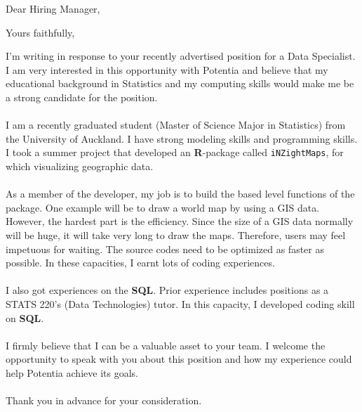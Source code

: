 \documentclass[12pt,a4paper,sans]{moderncv}        %
\begin{document}
	\date{\today}
	\opening{Dear Hiring Manager,}
	\closing{Yours faithfully,}
	\makelettertitle
		
	I’m writing in response to your recently advertised position for a Data Specialist. I am very interested in this opportunity with Potentia and believe that my educational background in Statistics and my computing skills would make me be a strong candidate for the position. \\~\\
	I am a recently graduated student (Master of Science Major in Statistics) from the University of Auckland. I have strong modeling skills and programming skills. I took a summer project that developed an \textbf{R}-package called \texttt{iNZightMaps}, for which visualizing geographic data. \\~\\
	As a member of the developer, my job is to build the based level functions of the package. One example will be to draw a world map by using a GIS data. 
	However, the hardest part is the efficiency. Since the size of a GIS data normally will be huge, it will take very long to draw the maps. Therefore, users may feel impetuous for waiting. The source codes need to be optimized as faster as possible. In these capacities, I earnt lots of coding experiences. \\~\\
	
	I also got experiences on the \textbf{SQL}. Prior experience includes positions as a STATS 220's (Data Technologies) tutor. In this capacity, I developed coding skill on \textbf{SQL}. \\~\\
	
	I firmly believe that I can be a valuable asset to your team. I welcome the opportunity to speak with you about this position and how my experience could help Potentia achieve its goals. \\~\\
	Thank you in advance for your consideration.

	\makeletterclosing
\end{document}
